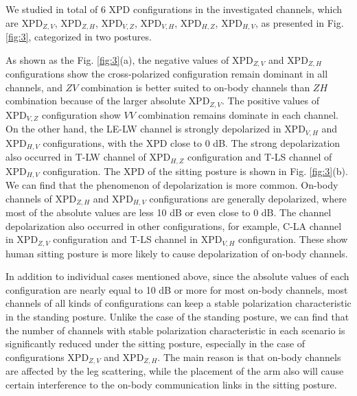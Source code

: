 \documentclass[conference]{IEEEtran}
\begin{document}

We studied in total of 6 XPD configurations in the investigated channels, which are $\text{XPD}_{Z,V}$, $\text{XPD}_{Z,H}$, $\text{XPD}_{V,Z}$, $\text{XPD}_{V,H}$, $\text{XPD}_{H,Z}$, $\text{XPD}_{H,V}$, as presented in Fig. \ref{fig:3}, categorized in two postures.


As shown as the Fig. \ref{fig:3}(a), the negative values of $\text{XPD}_{Z,V}$ and $\text{XPD}_{Z,H}$ configurations show the cross-polarized configuration remain dominant in all channels, and $ZV$ combination is better suited to on-body channels than $ZH$ combination because of the larger absolute $\text{XPD}_{Z,V}$. The positive values of $\text{XPD}_{V,Z}$ configuration show $VV$ combination remains dominate in each channel. On the other hand, the LE-LW channel is strongly depolarized in $\text{XPD}_{V,H}$ and $\text{XPD}_{H,V}$ configurations, with the XPD close to 0 dB. The strong depolarization also occurred in T-LW channel of $\text{XPD}_{H,Z}$ configuration and T-LS channel of $\text{XPD}_{H,V}$ configuration. The XPD of the sitting posture is shown in Fig. \ref{fig:3}(b). We can find that the phenomenon of depolarization is more common. On-body channels of $\text{XPD}_{Z,H}$ and $\text{XPD}_{H,V}$ configurations are generally depolarized, where most of the absolute values are less 10 dB or even close to 0 dB. The channel depolarization also occurred in other configurations, for example, C-LA channel in $\text{XPD}_{Z,V}$ configuration and T-LS channel in $\text{XPD}_{V,H}$ configuration. These show human sitting posture is more likely to cause depolarization of on-body channels.

In addition to individual cases mentioned above, since the absolute values of each configuration are nearly equal to 10 dB or more for most on-body channels, most channels of all kinds of configurations can keep a stable polarization characteristic in the standing posture. Unlike the case of  the standing posture, we can find that the number of channels with stable polarization characteristic in each scenario is significantly reduced under the sitting posture, especially in the case of configurations $\text{XPD}_{Z,V}$ and $\text{XPD}_{Z,H}$. The main reason is that on-body channels are affected by the leg scattering, while the placement of the arm also will cause certain interference to the on-body communication links in the sitting posture.
\end{document}
